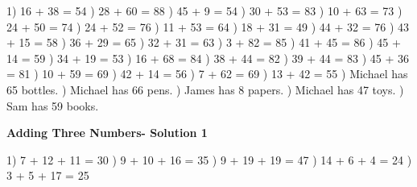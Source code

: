 \documentclass{article}%
\begin{document}
1) 16 + 38 = 54%
) 28 + 60 = 88%
) 45 + 9 = 54%
) 30 + 53 = 83%
) 10 + 63 = 73%
) 24 + 50 = 74%
) 24 + 52 = 76%
) 11 + 53 = 64%
) 18 + 31 = 49%
) 44 + 32 = 76%
) 43 + 15 = 58%
) 36 + 29 = 65%
) 32 + 31 = 63%
) 3 + 82 = 85%
) 41 + 45 = 86%
) 45 + 14 = 59%
) 34 + 19 = 53%
) 16 + 68 = 84%
) 38 + 44 = 82%
) 39 + 44 = 83%
) 45 + 36 = 81%
) 10 + 59 = 69%
) 42 + 14 = 56%
) 7 + 62 = 69%
) 13 + 42 = 55%
) Michael has 65 bottles.%
) Michael has 66 pens.%
) James has 8 papers.%
) Michael has 47 toys.%
) Sam has 59 books.%
\newline%
\newpage%
\large%
\begin{center}%
\textbf{Adding Three Numbers- Solution 1}%
\newline%
\end{center} \normalsize%
1) 7 + 12 + 11 = 30%
) 9 + 10 + 16 = 35%
) 9 + 19 + 19 = 47%
) 14 + 6 + 4 = 24%
) 3 + 5 + 17 = 25%
\end{document}
